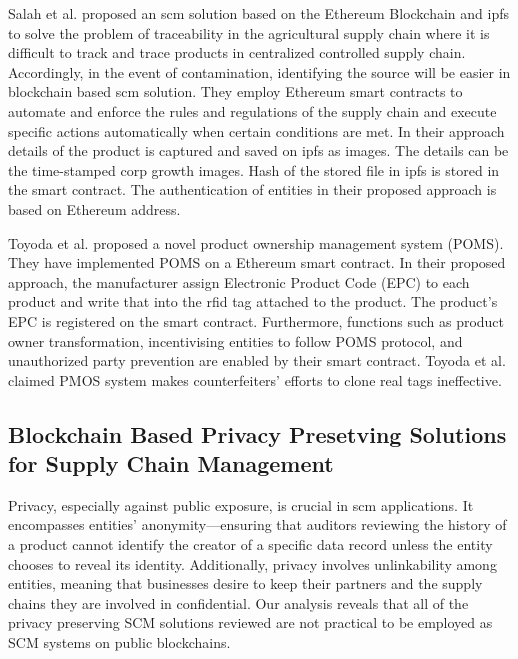 Salah et al. \cite{Salah2019} proposed an \gls{scm} solution based on the Ethereum Blockchain and \gls{ipfs} to solve the problem of traceability in the agricultural supply chain where it is difficult to track and trace products in centralized controlled supply chain. Accordingly, in the event of contamination, identifying the source will be easier in blockchain based \gls{scm} solution. They employ Ethereum smart contracts to automate and enforce the rules and regulations of the supply chain and execute specific actions automatically when certain conditions are met. In their approach details of the product is captured and saved on \gls{ipfs} as images. The details can be the time-stamped corp growth images. Hash of the stored file in \gls{ipfs} is stored in the smart contract. The authentication of entities in their proposed approach is based on Ethereum address.

Toyoda et al. \cite{Toyoda2017} proposed a novel product ownership management system (POMS). They have implemented POMS on a Ethereum smart contract. In their proposed approach, the manufacturer assign Electronic Product Code (EPC) to each product and write that into the \gls{rfid} tag attached to the product. The product's EPC is registered on the smart contract. Furthermore, functions such as product owner transformation, incentivising entities to follow POMS protocol, and unauthorized party prevention are enabled by their smart contract. Toyoda et al. claimed PMOS system makes counterfeiters' efforts to clone real tags ineffective. 


\subsection{Blockchain Based Privacy Presetving Solutions for Supply Chain Management}

Privacy, especially against public exposure, is crucial in \gls{scm} applications. It encompasses entities' anonymity—ensuring that auditors reviewing the history of a product cannot identify the creator of a specific data record unless the entity chooses to reveal its identity. Additionally, privacy involves unlinkability among entities, meaning that businesses desire to keep their partners and the supply chains they are involved in confidential. Our analysis reveals that all of the privacy preserving SCM solutions reviewed are not practical to be employed as SCM systems on public blockchains. 

